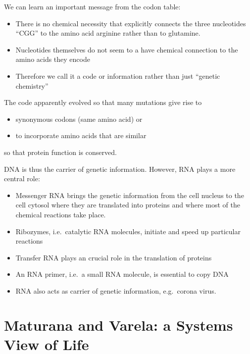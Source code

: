 \documentclass[
  11pt,
]{book}
\providecommand{\tightlist}{%
  \setlength{\itemsep}{0pt}\setlength{\parskip}{0pt}}
\begin{document}
We can learn an important message from the codon table:

\begin{itemize}
\item
  There is no chemical necessity that explicitly connects the three nucleotides ``CGG'' to the amino acid arginine rather than to glutamine.
\item
  Nucleotides themselves do not seem to a have chemical connection to the amino acids they encode
\item
  Therefore we call it a code or information rather than just ``genetic chemistry''
\end{itemize}

The code apparently evolved so that many mutations give rise to

\begin{itemize}
\tightlist
\item
  synonymous codons (same amino acid) or
\item
  to incorporate amino acids that are similar
\end{itemize}

so that protein function is conserved.

DNA is thus the carrier of genetic information. However, RNA plays a more central role:

\begin{itemize}
\tightlist
\item
  Messenger RNA brings the genetic information from the cell nucleus to the cell cytosol where they are translated into proteins and where most of the chemical reactions take place.
\item
  Ribozymes, i.e.~catalytic RNA molecules, initiate and speed up particular reactions
\item
  Transfer RNA plays an crucial role in the translation of proteins
\item
  An RNA primer, i.e.~a small RNA molecule, is essential to copy DNA
\item
  RNA also acts as carrier of genetic information, e.g.~corona virus.
\end{itemize}

\newpage

\hypertarget{maturana-and-varela-a-systems-view-of-life}{%
\section{Maturana and Varela: a Systems View of Life}\label{maturana-and-varela-a-systems-view-of-life}}
\end{document}

